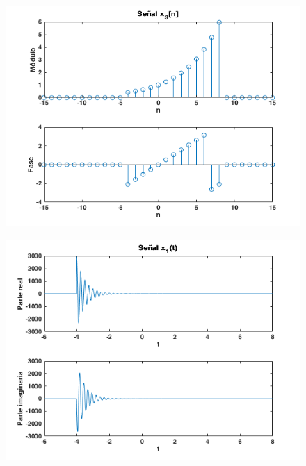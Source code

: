 \documentclass{article}
\begin{document}
\begin{figure} \caption[Figura 4]{}
	\centering
		\includegraphics[width=\linewidth]{./Figures/04.png}
\end{figure}

\begin{figure} \caption[Figura 5]{}
	\centering
		\includegraphics[width=\linewidth]{./Figures/05.png}
\end{figure}
\end{document}
